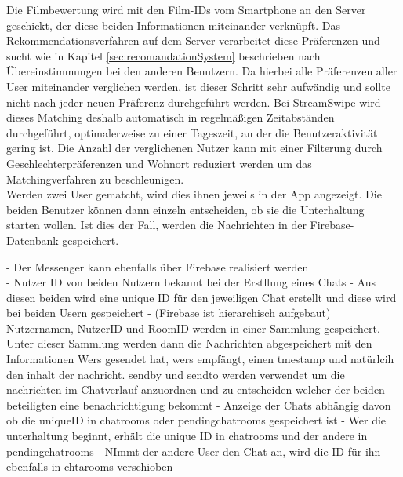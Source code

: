 Die Filmbewertung wird mit den Film-IDs vom Smartphone an den Server geschickt, der diese beiden Informationen miteinander verknüpft. Das Rekommendationsverfahren auf dem Server verarbeitet diese Präferenzen und sucht wie in Kapitel \ref{sec:recomandationSystem} beschrieben nach Übereinstimmungen bei den anderen Benutzern. Da hierbei alle Präferenzen aller User miteinander verglichen werden, ist dieser Schritt sehr aufwändig und sollte nicht nach jeder neuen Präferenz durchgeführt werden. Bei StreamSwipe wird dieses Matching deshalb automatisch in regelmäßigen Zeitabständen durchgeführt, optimalerweise zu einer Tageszeit, an der die Benutzeraktivität gering ist. Die Anzahl der verglichenen Nutzer kann mit einer Filterung durch Geschlechterpräferenzen und Wohnort reduziert werden um das Matchingverfahren zu beschleunigen. \\
Werden zwei User gematcht, wird dies ihnen jeweils in der App angezeigt. Die beiden Benutzer können dann einzeln entscheiden, ob sie die Unterhaltung starten wollen. Ist dies der Fall, werden die Nachrichten in der Firebase-Datenbank gespeichert. %



- Der Messenger kann ebenfalls über Firebase realisiert werden\\ %

- Nutzer ID von beiden Nutzern bekannt bei der  Erstllung eines Chats
- Aus diesen beiden wird eine unique ID für den jeweiligen Chat erstellt und diese wird bei beiden Usern gespeichert
- (Firebase ist hierarchisch aufgebaut) Nutzernamen, NutzerID und RoomID werden in einer Sammlung gespeichert. Unter dieser Sammlung werden dann die Nachrichten abgespeichert mit den Informationen Wers gesendet hat, wers empfängt, einen tmestamp und natürlcih den inhalt der nachricht. sendby und sendto werden verwendet um die nachrichten im Chatverlauf anzuordnen und zu entscheiden welcher der beiden beteiligten eine benachrichtigung bekommt
- Anzeige der Chats abhängig davon ob die uniqueID in chatrooms oder pendingchatrooms gespeichert ist
- Wer die unterhaltung beginnt, erhält die unique ID in chatrooms und der andere in pendingchatrooms
- NImmt der andere User den Chat an, wird die ID für ihn ebenfalls in chtarooms verschioben
-


